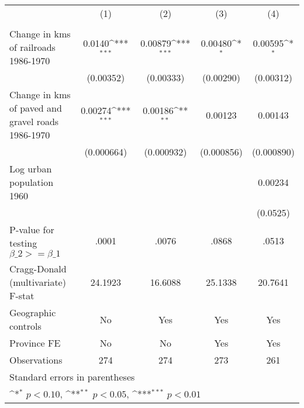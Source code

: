 {
\def\sym#1{\ifmmode^{#1}\else\(^{#1}\)\fi}
\begin{tabular}{l*{4}{c}}
\hline\hline
                &\multicolumn{1}{c}{(1)}&\multicolumn{1}{c}{(2)}&\multicolumn{1}{c}{(3)}&\multicolumn{1}{c}{(4)}\\
                &\multicolumn{1}{c}{}&\multicolumn{1}{c}{}&\multicolumn{1}{c}{}&\multicolumn{1}{c}{}\\
\hline
Change in kms of railroads 1986-1970&   0.0140\sym{***}&  0.00879\sym{***}&  0.00480\sym{*}  &  0.00595\sym{*}  \\
                &(0.00352)         &(0.00333)         &(0.00290)         &(0.00312)         \\
[1em]
Change in kms of paved and gravel roads 1986-1970&  0.00274\sym{***}&  0.00186\sym{**} &  0.00123         &  0.00143         \\
                &(0.000664)         &(0.000932)         &(0.000856)         &(0.000890)         \\
[1em]
Log urban population 1960&                  &                  &                  &  0.00234         \\
                &                  &                  &                  & (0.0525)         \\
\hline
P-value for testing $\beta\_{2} >= \beta\_{1}$&    .0001         &    .0076         &    .0868         &    .0513         \\
Cragg-Donald (multivariate) F-stat&  24.1923         &  16.6088         &  25.1338         &  20.7641         \\
Geographic controls&       No         &      Yes         &      Yes         &      Yes         \\
Province FE     &       No         &       No         &      Yes         &      Yes         \\
Observations    &      274         &      274         &      273         &      261         \\
\hline\hline
\multicolumn{5}{l}{\footnotesize Standard errors in parentheses}\\
\multicolumn{5}{l}{\footnotesize \sym{*} \(p<0.10\), \sym{**} \(p<0.05\), \sym{***} \(p<0.01\)}\\
\end{tabular}
}
